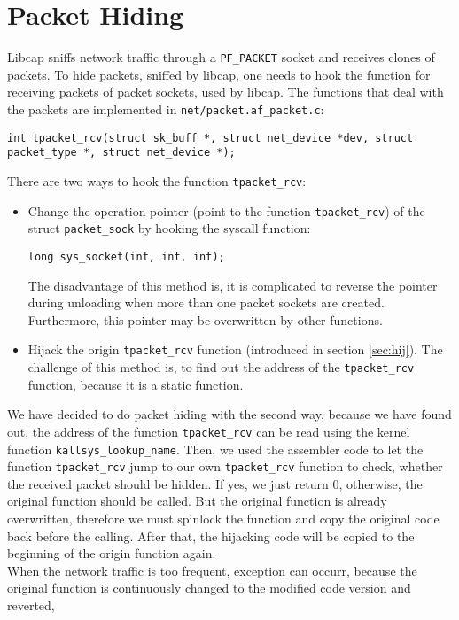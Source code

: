 \section{Packet Hiding}
Libcap sniffs network traffic through a \texttt{PF\_PACKET} socket and receives clones 
of packets. To hide packets, sniffed by libcap, one needs to hook the 
function for receiving packets of packet sockets, used by libcap. The 
functions that deal with the packets are implemented in \verb+net/packet.af_packet.c+: 
\lstset{escapechar=,style=customc}
\begin{lstlisting}
int tpacket_rcv(struct sk_buff *, struct net_device *dev, struct packet_type *, struct net_device *); 
\end{lstlisting}
There are two ways to hook the function \texttt{tpacket\_rcv}:
\begin{itemize}
\item Change the operation pointer (point to the function \texttt{tpacket\_rcv}) of the struct \texttt{packet\_sock} by hooking the syscall function:
\lstset{escapechar=,style=customc}
\begin{lstlisting}
long sys_socket(int, int, int);
\end{lstlisting}
The disadvantage of this method is, it is complicated to reverse the pointer during unloading when more than one packet sockets are created. Furthermore, this pointer may be overwritten by other functions.
\item Hijack the origin \texttt{tpacket\_rcv} function (introduced in section \ref{sec:hij}). The challenge of this method is, to find out the address of the \texttt{tpacket\_rcv} function, because it is a static function.  
\end{itemize}
We have decided to do packet hiding with the second way, because we have found out, the address of the function \texttt{tpacket\_rcv} can be read using the kernel function \texttt{kallsys\_lookup\_name}. Then, we used the assembler code to let the function \texttt{tpacket\_rcv} jump to our own \texttt{tpacket\_rcv} function to check, whether the received packet should be hidden. If yes, we just return 0, otherwise, the original function should be called. But the original function is already overwritten, therefore we must spinlock the function and copy the original code back before the calling. After that, the hijacking code will be copied to the beginning of the origin function again. \\
When the network traffic is too frequent, exception can occurr, because the original
function is continuously changed to the modified code version and reverted, 
